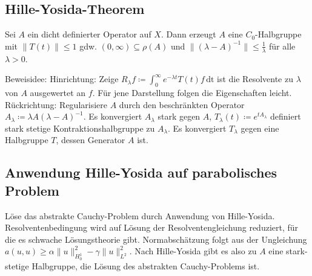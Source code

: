 \documentclass[11pt,a4paper]{scrartcl}
\theoremstyle{plain}
\theoremstyle{definition}
\theoremstyle{remark}
\begin{document}
\subsection{Hille-Yosida-Theorem}

Sei $A$ ein dicht definierter Operator auf $X$. Dann erzeugt $A$ eine $C_0$-Halbgruppe mit $\|T(t)\| \leq 1$ gdw. $(0,\infty) \subseteq \rho(A)$ und $\|(\lambda-A)^{-1}\| \leq \frac{1}{\lambda}$ für alle $\lambda > 0$. 

Beweisidee: Hinrichtung: Zeige $R_\lambda f\coloneqq \int_{0}^{\infty} e^{-\lambda t}T(t)f \, \mathrm{dt}$ ist die Resolvente zu $\lambda$ von $A$ ausgewertet an $f$. Für jene Darstellung folgen die Eigenschaften leicht. Rückrichtung: Regularisiere $A$ durch den beschränkten Operator $A_\lambda \coloneqq \lambda A (\lambda-A)^{-1}$. Es konvergiert $A_\lambda$ stark gegen $A$, $T_\lambda(t) \coloneqq e^{tA_\lambda}$ definiert stark stetige Kontraktionshalbgruppe zu $A_\lambda$. Es konvergiert $T_\lambda$ gegen eine Halbgruppe $T$, dessen Generator $A$ ist.

\subsection{Anwendung Hille-Yosida auf parabolisches Problem}

Löse das abstrakte Cauchy-Problem durch Anwendung von Hille-Yosida. Resolventenbedingung wird auf Lösung der Resolventengleichung reduziert, für die es schwache Lösungstheorie gibt. Normabschätzung folgt aus der Ungleichung $a(u,u) \geq \alpha \|u\|_{H^1_0}^2 - \gamma \|u\|_{L^2}^2$. Nach Hille-Yosida gibt es also zu $A$ eine stark-stetige Halbgruppe, die Lösung des abstrakten Cauchy-Problems ist.
\end{document}
